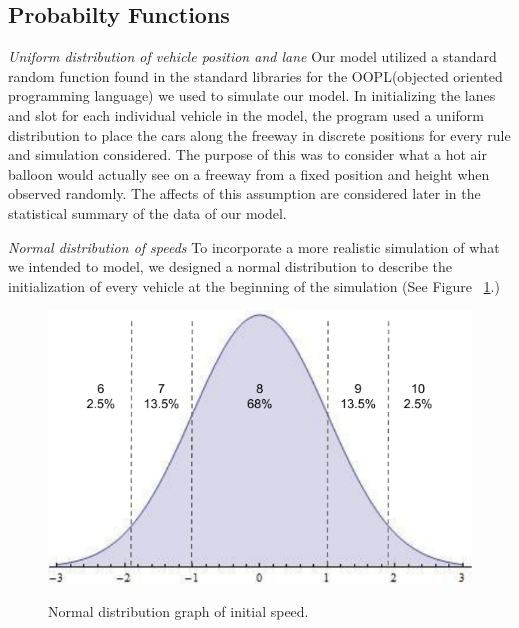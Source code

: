 \documentclass{amsart}
\begin{document}
	
	\subsection{Probabilty Functions}
		\textit{Uniform distribution of vehicle position and lane}
			Our model utilized a standard random function found in the standard libraries for the OOPL(objected oriented programming language) we used to simulate our model. In initializing the lanes and slot for each individual vehicle in the model, the program used a uniform distribution to place the cars along the freeway in discrete positions for every rule and simulation considered. The purpose of this was to consider what a hot air balloon would actually see on a freeway from a fixed position and height when observed randomly. The affects of this assumption are considered later in the statistical summary of the data of our model. 

		\textit{Normal distribution of speeds} 
			To incorporate a more realistic simulation of what we intended to model, we designed a normal distribution to describe the initialization of every vehicle at the beginning of the simulation (See Figure ~\ref{MCMNormDist}.)
			
					
\begin{figure}[h]
\begin{center}
\includegraphics[scale=0.65]{MCM-speedsnormaldist}
\caption{Normal distribution graph of initial speed.}
\renewcommand{\figurename}{}
\label{MCMNormDist}
\end{center}
\end{figure}
\end{document}
